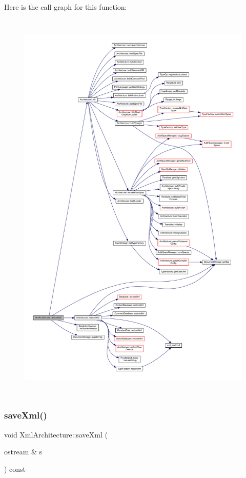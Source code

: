 Here is the call graph for this function\+:
\nopagebreak
\begin{figure}[H]
\begin{center}
\leavevmode
\includegraphics[height=550pt]{class_xml_architecture_aead4d5224e18ab98cd30ca89774b9faa_cgraph}
\end{center}
\end{figure}
\mbox{\label{class_xml_architecture_abf5dd16b5343f89d2b165cf2206c7bf6}} 
\subsubsection{\texorpdfstring{saveXml()}{saveXml()}}
{\footnotesize\ttfamily void Xml\+Architecture\+::save\+Xml (\begin{DoxyParamCaption}\item[{ostream \&}]{s }\end{DoxyParamCaption}) const\hspace{0.3cm}{\ttfamily [virtual]}}

